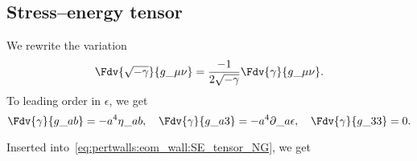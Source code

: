 


\subsection{Stress--energy tensor}\label{app:derivations:NG_action:SE_tensor}
    We rewrite the variation
    \begin{equation}
        \Fdv{\sqrt{-\gamma}}{g\_{\mu\nu}} =\frac{-1}{2\sqrt{-\gamma}} \Fdv{\gamma}{g\_{\mu\nu}}.
    \end{equation}
    To leading order in $\epsilon$, we get
    \begin{equation}
        \Fdv{\gamma}{g\_{ab}}  = -a^4 \eta\_{ab}, \quad
        \Fdv{\gamma}{g\_{a3}}  = -a^4 \partial\_a \epsilon, \quad
        \Fdv{\gamma}{g\_{33}}  =  0.
    \end{equation}

    Inserted into~\cref{eq:pertwalls:eom_wall:SE_tensor_NG}, we get

    



